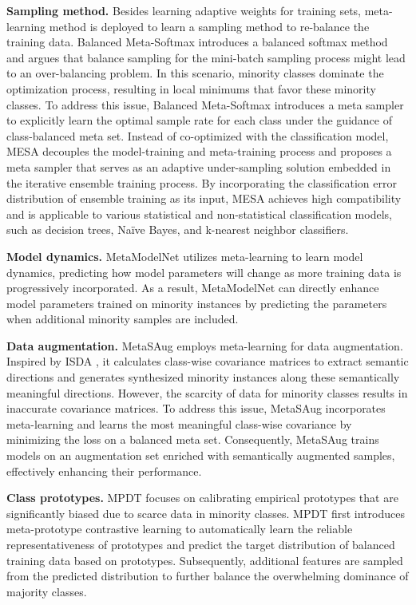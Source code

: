 \textbf{Sampling method.}
Besides learning adaptive weights for training sets, meta-learning method is deployed to learn a sampling method to re-balance the training data. Balanced Meta-Softmax \cite{ren2020balanced} introduces a balanced softmax method and argues that balance sampling for the mini-batch sampling process might lead to an over-balancing problem. In this scenario, minority classes dominate the optimization process, resulting in local minimums that favor these minority classes. To address this issue, Balanced Meta-Softmax introduces a meta sampler to explicitly learn the optimal sample rate for each class under the guidance of class-balanced meta set.
Instead of co-optimized with the classification model, MESA \cite{liu2020mesa} decouples the model-training and meta-training process and proposes a meta sampler that serves as an adaptive under-sampling solution embedded in the iterative ensemble training process. By incorporating the classification error distribution of ensemble training as its input, MESA achieves high compatibility and is applicable to various statistical and non-statistical classification models, such as decision trees, Naïve Bayes, and k-nearest neighbor classifiers.

\textbf{Model dynamics.}
MetaModelNet \cite{wang2017learning} utilizes meta-learning to learn model dynamics, predicting how model parameters will change as more training data is progressively incorporated. As a result, MetaModelNet can directly enhance model parameters trained on minority instances by predicting the parameters when additional minority samples are included.

\textbf{Data augmentation.}
MetaSAug \cite{li2021metasaug} employs meta-learning for data augmentation. Inspired by ISDA \cite{wang2019implicit}, it calculates class-wise covariance matrices to extract semantic directions and generates synthesized minority instances along these semantically meaningful directions. However, the scarcity of data for minority classes results in inaccurate covariance matrices. To address this issue, MetaSAug incorporates meta-learning and learns the most meaningful class-wise covariance by minimizing the loss on a balanced meta set. Consequently, MetaSAug trains models on an augmentation set enriched with semantically augmented samples, effectively enhancing their performance.

\textbf{Class prototypes.}
MPDT \cite{fu2022meta} focuses on calibrating empirical prototypes that are significantly biased due to scarce data in minority classes. MPDT first introduces meta-prototype contrastive learning to automatically learn the reliable representativeness of prototypes and predict the target distribution of balanced training data based on prototypes. Subsequently, additional features are sampled from the predicted distribution to further balance the overwhelming dominance of majority classes.








